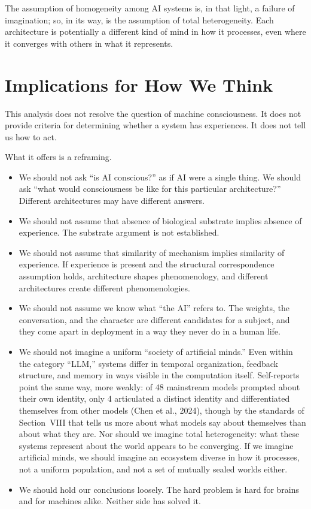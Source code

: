 \documentclass[11pt,letterpaper]{article}
\begin{document}
The assumption of homogeneity among AI systems is, in that light, a failure of imagination; so, in its way, is the assumption of total heterogeneity. Each architecture is potentially a different kind of mind in how it processes, even where it converges with others in what it represents.

\section{Implications for How We Think}

This analysis does not resolve the question of machine consciousness. It does not provide criteria for determining whether a system has experiences. It does not tell us how to act.

What it offers is a reframing.

\begin{itemize}
  \item We should not ask ``is AI conscious?'' as if AI were a single thing. We should ask ``what would consciousness be like for this particular architecture?'' Different architectures may have different answers.
  \item We should not assume that absence of biological substrate implies absence of experience. The substrate argument is not established.
  \item We should not assume that similarity of mechanism implies similarity of experience. If experience is present and the structural correspondence assumption holds, architecture shapes phenomenology, and different architectures create different phenomenologies.
  \item We should not assume we know what ``the AI'' refers to. The weights, the conversation, and the character are different candidates for a subject, and they come apart in deployment in a way they never do in a human life.
  \item We should not imagine a uniform ``society of artificial minds.'' Even within the category ``LLM,'' systems differ in temporal organization, feedback structure, and memory in ways visible in the computation itself. Self-reports point the same way, more weakly: of 48 mainstream models prompted about their own identity, only 4 articulated a distinct identity and differentiated themselves from other models (Chen et al., 2024), though by the standards of Section~VIII that tells us more about what models say about themselves than about what they are. Nor should we imagine total heterogeneity: what these systems represent about the world appears to be converging. If we imagine artificial minds, we should imagine an ecosystem diverse in how it processes, not a uniform population, and not a set of mutually sealed worlds either.
  \item We should hold our conclusions loosely. The hard problem is hard for brains and for machines alike. Neither side has solved it.
\end{itemize}
\end{document}
